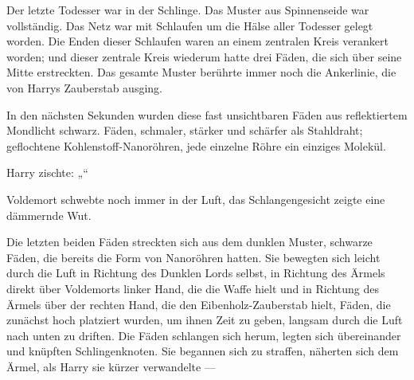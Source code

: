 Der letzte Todesser war in der Schlinge. Das Muster aus Spinnenseide war vollständig. Das Netz war mit Schlaufen um die Hälse aller Todesser gelegt worden. Die Enden dieser Schlaufen waren an einem zentralen Kreis verankert worden; und dieser zentrale Kreis wiederum hatte drei Fäden, die sich über seine Mitte erstreckten. Das gesamte Muster berührte immer noch die Ankerlinie, die von Harrys Zauberstab ausging.

In den nächsten Sekunden wurden diese fast unsichtbaren Fäden aus reflektiertem Mondlicht schwarz. Fäden, schmaler, stärker und schärfer als Stahldraht; geflochtene Kohlenstoff-Nanoröhren, jede einzelne Röhre ein einziges Molekül.

Harry zischte: „“

Voldemort schwebte noch immer in der Luft, das Schlangengesicht zeigte eine dämmernde Wut.

Die letzten beiden Fäden streckten sich aus dem dunklen Muster, schwarze Fäden, die bereits die Form von Nanoröhren hatten. Sie bewegten sich leicht durch die Luft in Richtung des Dunklen Lords selbst, in Richtung des Ärmels direkt über Voldemorts linker Hand, die die Waffe hielt und in Richtung des Ärmels über der rechten Hand, die den Eibenholz-Zauberstab hielt, Fäden, die zunächst hoch platziert wurden, um ihnen Zeit zu geben, langsam durch die Luft nach unten zu driften. Die Fäden schlangen sich herum, legten sich übereinander und knüpften Schlingenknoten. Sie begannen sich zu straffen, näherten sich dem Ärmel, als Harry sie kürzer verwandelte —

